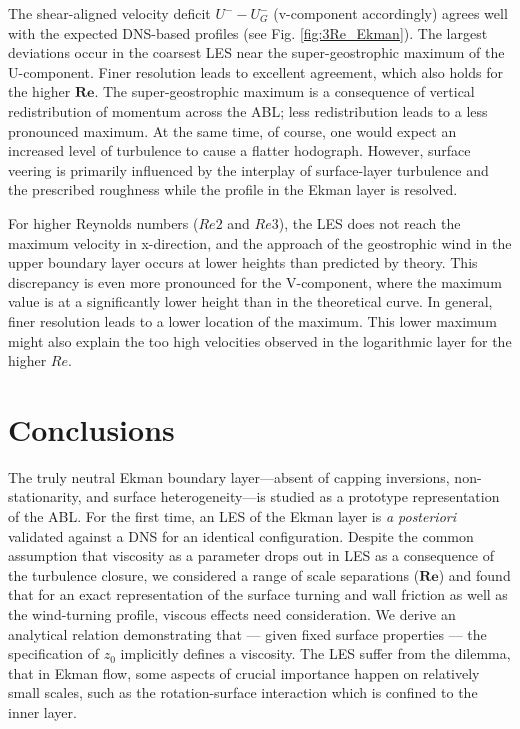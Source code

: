 \documentclass[smallcondensed,final]{svjour3}
\newcommand{\RE}{\mathbf{Re}}
\begin{document}
The shear-aligned velocity deficit $U^--U^-_G$ (v-component accordingly) agrees well with the expected DNS-based profiles (see Fig. \ref{fig:3Re_Ekman}). The largest deviations occur in the coarsest LES near the super-geostrophic maximum of the U-component. Finer resolution leads to excellent agreement, which also holds for the higher $\RE$. The super-geostrophic maximum is a consequence of vertical redistribution of momentum across the ABL; less redistribution leads to a less pronounced maximum. At the same time, of course, one would expect an increased level of turbulence to cause a flatter hodograph. However, surface veering is primarily influenced by the interplay of surface-layer turbulence and the prescribed roughness while the profile in the Ekman layer is resolved.

For higher Reynolds numbers ($Re2$ and $Re3$), the LES does not reach the maximum velocity in x-direction, and the approach of the geostrophic wind in the upper boundary layer occurs at lower heights than predicted by theory. This discrepancy is even more pronounced for the V-component, where the maximum value is at a significantly lower height than in the theoretical curve. In general, finer resolution leads to a lower location of the maximum. This lower maximum might also explain the too high velocities observed in the logarithmic layer for the higher $Re$.


\section{Conclusions}
\label{conclusion}

The truly neutral Ekman boundary layer---absent of capping inversions, non-statio\-narity, and surface heterogeneity---is studied as a prototype representation of the ABL. For the first time, an LES of the Ekman layer is \emph{a posteriori} validated against a DNS for an identical configuration. Despite the common assumption that viscosity as a parameter drops out in LES as a consequence of the turbulence closure, we considered a range of scale separations ($\RE$) and found that for an exact representation of the surface turning and wall friction as well as the wind-turning profile, viscous effects need consideration. We derive an analytical relation demonstrating that --- given fixed surface properties --- the specification of $z_0$ implicitly defines a viscosity. The LES suffer from the dilemma, that in Ekman flow, some aspects of crucial importance happen on relatively small scales, such as the rotation-surface interaction which is confined to the inner layer.
\end{document}
